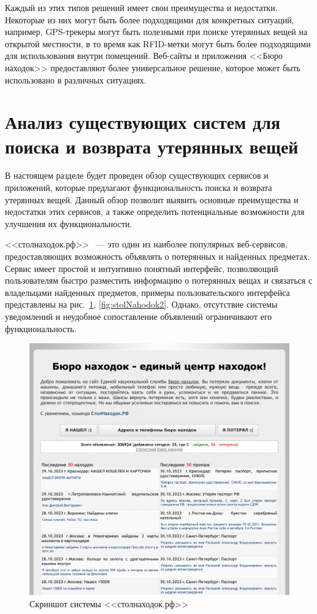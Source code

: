 \documentclass{../mirea}
\begin{document}
	Каждый из этих типов решений имеет свои преимущества и недостатки. Некоторые из них могут быть более подходящими для конкретных ситуаций, например, GPS-трекеры могут быть полезными при поиске утерянных вещей на открытой местности, в то время как RFID-метки могут быть более подходящими для использования внутри помещений. Веб-сайты и приложения <<Бюро находок>> предоставляют более универсальное решение, которое может быть использовано в различных ситуациях.
	
	\section{Анализ существующих систем для поиска и возврата утерянных вещей}
	
	В настоящем разделе будет проведен обзор существующих сервисов и приложений, которые предлагают функциональность поиска и возврата утерянных вещей. Данный обзор позволит выявить основные преимущества и недостатки этих сервисов, а также определить потенциальные возможности для улучшения их функциональности.
	
	<<столнаходок.рф>>~\cite{bib:stol_nahodok} --- это один из наиболее популярных веб-сервисов, предоставляющих возможность объявлять о потерянных и найденных предметах. Сервис имеет простой и интуитивно понятный интерфейс, позволяющий пользователям быстро разместить информацию о потерянных вещах и связаться с владельцами найденных предметов, примеры пользовательского интерфейса представлены на рис.~\ref{fig:stolNahodok1}, \ref{fig:stolNahodok2}. Однако, отсутствие системы уведомлений и неудобное сопоставление объявлений ограничивают его функциональность.
	
	\begin{figure}[htb]
		\centering
		\includegraphics[width=.95\textwidth]{../images/stolNahodok1}
		\parskip=6pt
		\caption{Скриншот системы <<столнаходок.рф>>}
		\label{fig:stolNahodok1}
	\end{figure}
	
\end{document}
